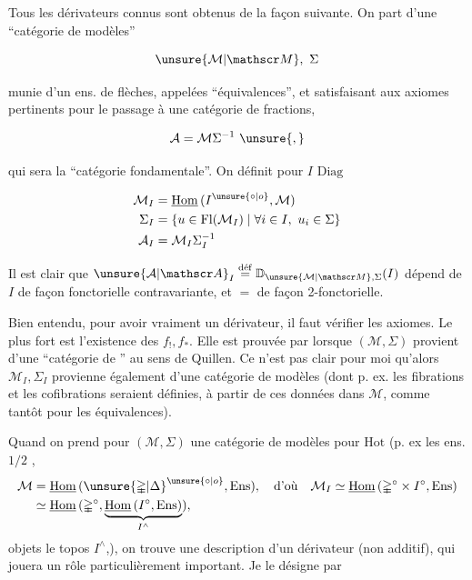
Tous les dérivateurs connus sont obtenus de la façon  suivante. On part d'une ``catégorie de modèles''

\[
\unsure{\mathcal M|\mathscr M},\ \Sigma
\]

munie d'un ens. de flèches, appelées ``équivalences'', et satisfaisant aux axiomes pertinents pour le passage à une catégorie de fractions,

\[
\mathcal A=\mathcal M\Sigma^{-1}\ \unsure{,}
\]

qui sera la ``catégorie fondamentale''. On définit pour  $I$  $\mathrm{Diag}$

\[
\begin{aligned}
\mathcal M_{I}&=\underline{\mathrm{Hom}}\,(I^{\unsure{\circ|o}},\mathcal M)\\
\Sigma_{I}&=\{u\in\mathrm{Fl}(\mathcal M_{I})\mid\forall i\in I,\ u_{i}\in\Sigma\}\\
\mathcal A_{I}&=\mathcal M_{I}\Sigma_{I}^{-1}
\end{aligned}
\]


Il est clair que $\unsure{\mathcal A|\mathscr A}_{I}\overset{\mathrm{d\acute ef}}{=}\mathbb D_{\unsure{\mathcal M|\mathscr M},\Sigma}(I)$ dépend de $I$ de façon fonctorielle contravariante, et $=$ de façon 2-fonctorielle.

Bien entendu, pour avoir vraiment un dérivateur, il faut vérifier les axiomes. Le plus fort est l'existence des $f_{!},f_{*}$. Elle est prouvée par \uline{} lorsque $(\mathcal M,\Sigma)$ provient d'une ``catégorie de '' au sens de Quillen. Ce n'est pas clair pour moi qu'alors $\mathcal M_{I},\Sigma_{I}$ provienne également d'une catégorie de modèles (dont p. ex. les fibrations et les cofibrations seraient définies, à partir de ces données dans $\mathcal M$, comme tantôt pour les équivalences).

Quand on prend pour $(\mathcal M,\Sigma)$ une catégorie de modèles pour $\mathrm{Hot}$ (p. ex les ens. $1/2$ , \[
\begin{aligned}
\mathcal M&=\underline{\mathrm{Hom}}\,(\unsure{\mathbb{\Delta}|\Delta}^{\unsure{\circ|o}},\mathrm{Ens}),\quad\text{d'où}\quad\mathcal M_{I}\simeq\underline{\mathrm{Hom}}\,(\mathbb{\Delta}^{\circ}\times I^{\circ},\mathrm{Ens})\\
&\simeq\underline{\mathrm{Hom}}\,(\mathbb{\Delta}^{\circ},\underbrace{\underline{\mathrm{Hom}}\,(I^{\circ},\mathrm{Ens})}_{I^{\wedge}}),
\end{aligned}
\]  objets   le topos $I^{\wedge}$,), on trouve une description d'un dérivateur (non additif), qui jouera un rôle particulièrement important. Je le désigne par

